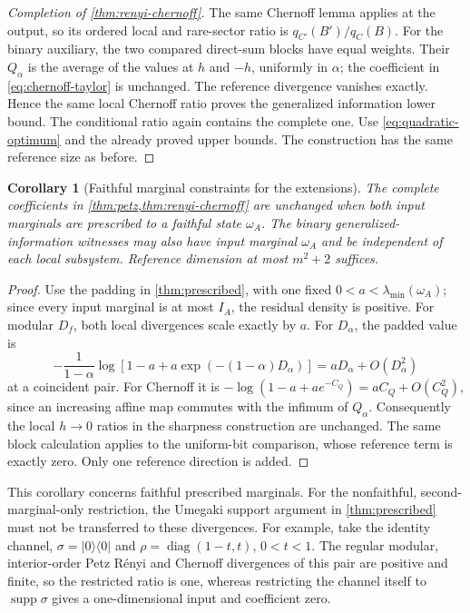 \documentclass[11pt]{article}
\numberwithin{equation}{section}
\newtheorem{corollary}[theorem]{Corollary}
\theoremstyle{definition}
\theoremstyle{remark}
\DeclareMathOperator{\supp}{supp}
\DeclareMathOperator{\diag}{diag}
\newcommand{\ket}[1]{\lvert #1\rangle}
\newcommand{\bra}[1]{\langle #1\rvert}
\begin{document}
\begin{proof}[Completion of \cref{thm:renyi-chernoff}]
The same Chernoff lemma applies at the output, so its ordered local and
rare-sector ratio is $q_{C'}(B')/q_C(B)$.
For the binary auxiliary, the two compared direct-sum blocks have equal
weights. Their $Q_\alpha$ is the average of the values at $h$ and $-h$,
uniformly in $\alpha$; the coefficient in
\eqref{eq:chernoff-taylor} is unchanged.
The reference divergence vanishes exactly. Hence the same local
Chernoff ratio proves the generalized information lower bound.
The conditional ratio again contains the complete one.
Use \eqref{eq:quadratic-optimum} and the already proved upper bounds.
The construction has the same reference size as before.
\end{proof}

\begin{corollary}[Faithful marginal constraints for the extensions]
\label{cor:extended-padding}
The complete coefficients in \cref{thm:petz,thm:renyi-chernoff}
are unchanged when both input marginals are prescribed to a faithful
state $\omega_A$. The binary generalized-information witnesses may
also have input marginal $\omega_A$ and be independent of each local
subsystem. Reference dimension at most $m^2+2$ suffices.
\end{corollary}
\begin{proof}
Use the padding in \cref{thm:prescribed}, with one fixed
$0<a<\lambda_{\min}(\omega_A)$; since every input marginal is at
most $I_A$, the residual density is positive.
For modular $D_f$, both local divergences scale exactly by $a$.
For $D_\alpha$, the padded value is
\[
 -\frac1{1-\alpha}
 \log\!\left[1-a+a\exp(-(1-\alpha)D_\alpha)\right]
 =aD_\alpha+O(D_\alpha^2)
\]
at a coincident pair. For Chernoff it is
$-\log(1-a+a e^{-C_Q})=aC_Q+O(C_Q^2)$, since an increasing
affine map commutes with the infimum of $Q_\alpha$.
Consequently the local $h\to0$ ratios in the sharpness construction
are unchanged. The same block calculation applies to the uniform-bit
comparison, whose reference term is exactly zero. Only one reference
direction is added.
\end{proof}

This corollary concerns faithful prescribed marginals.
For the nonfaithful, second-marginal-only restriction, the Umegaki
support argument in \cref{thm:prescribed} must not be transferred to
these divergences. For example, take the identity channel,
$\sigma=\ket0\bra0$ and
$\rho=\diag(1-t,t)$, $0<t<1$. The regular modular, interior-order
Petz R\'enyi and Chernoff divergences of this pair are positive and
finite, so the restricted ratio is one, whereas restricting the
channel itself to $\supp\sigma$ gives a one-dimensional input and
coefficient zero.
\end{document}
